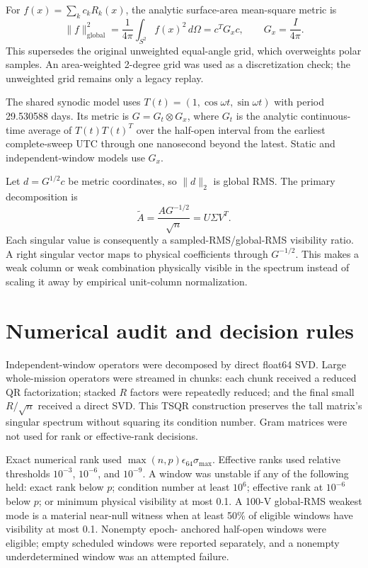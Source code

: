 \documentclass[11pt]{article}
\begin{document}
For $f(x)=\sum_k c_kR_k(x)$, the analytic surface-area mean-square metric is
\begin{equation}
 \lVert f\rVert_{\mathrm{global}}^2
 =\frac{1}{4\pi}\int_{S^2}f(x)^2\,d\Omega
 =c^T G_xc,\qquad G_x=\frac{I}{4\pi}.
 \label{eq:spatialmetric}
\end{equation}
This supersedes the original unweighted equal-angle grid, which overweights
polar samples.  An area-weighted 2-degree grid was used as a discretization
check; the unweighted grid remains only a legacy replay.

The shared synodic model uses
$T(t)=(1,\cos\omega t,\sin\omega t)$ with period 29.530588 days.  Its metric is
$G=G_t\otimes G_x$, where $G_t$ is the analytic continuous-time average of
$T(t)T(t)^T$ over the half-open interval from the earliest complete-sweep UTC
through one nanosecond beyond the latest.  Static and independent-window
models use $G_x$.

Let $d=G^{1/2}c$ be metric coordinates, so $\lVert d\rVert_2$ is global RMS.
The primary decomposition is
\begin{equation}
 \widetilde A=\frac{A G^{-1/2}}{\sqrt n}=U\Sigma V^T.
 \label{eq:metricoperator}
\end{equation}
Each singular value is consequently a sampled-RMS/global-RMS visibility
ratio.  A right singular vector maps to physical coefficients through
$G^{-1/2}$.  This makes a weak column or weak combination physically visible
in the spectrum instead of scaling it away by empirical unit-column
normalization.

\section{Numerical audit and decision rules}

Independent-window operators were decomposed by direct float64 SVD.  Large
whole-mission operators were streamed in chunks: each chunk received a reduced
QR factorization; stacked $R$ factors were repeatedly reduced; and the final
small $R/\sqrt n$ received a direct SVD.  This TSQR construction preserves the
tall matrix's singular spectrum without squaring its condition number.  Gram
matrices were not used for rank or effective-rank decisions.

Exact numerical rank used
$\max(n,p)\epsilon_{64}\sigma_{\max}$.  Effective ranks used relative
thresholds $10^{-3}$, $10^{-6}$, and $10^{-9}$.  A window was unstable if any
of the following held: exact rank below $p$; condition number at least $10^6$;
effective rank at $10^{-6}$ below $p$; or minimum physical visibility at most
0.1.  A 100-V global-RMS weakest mode is a material near-null witness when at
least 50\% of eligible windows have visibility at most 0.1.  Nonempty epoch-
anchored half-open windows were eligible; empty scheduled windows were reported
separately, and a nonempty underdetermined window was an attempted failure.
\end{document}
